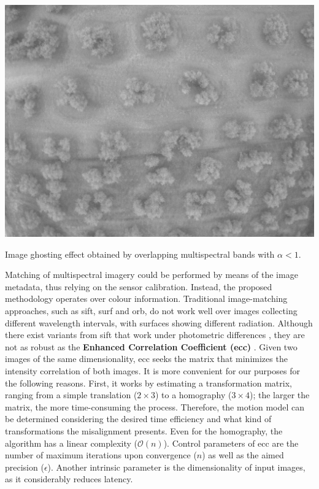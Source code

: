 \begin{marginfigure}[.2cm]
  \includegraphics{figs/image_fusion/multispectral_ghost_effect.png}
  \caption{Image ghosting effect obtained by overlapping multispectral bands with $\alpha < 1$.}
  \label{fig:multispectral_ghost_effect}
\end{marginfigure}
Matching of multispectral imagery could be performed by means of the image metadata, thus relying on the sensor calibration. Instead, the proposed methodology operates over colour information. Traditional image-matching approaches, such as \acrshort{sift}, \acrshort{surf} and \acrshort{orb}, do not work well over images collecting different wavelength intervals, with surfaces showing different radiation. Although there exist variants from \acrshort{sift} that work under photometric differences \cite{park_pi-sift_2008}, they are not as robust as the \textbf{Enhanced Correlation Coefficient (\acrshort{ecc})} \cite{evangelidis_parametric_2008}. Given two images of the same dimensionality, \acrshort{ecc} seeks the matrix that minimizes the intensity correlation of both images. It is more convenient for our purposes for the following reasons. First, it works by estimating a transformation matrix, ranging from a simple translation ($2 \times 3$) to a homography ($3 \times 4$); the larger the matrix, the more time-consuming the process. Therefore, the motion model can be determined considering the desired time efficiency and what kind of transformations the misalignment presents. Even for the homography, the algorithm has a linear complexity ($\mathcal{O}(n)$). Control parameters of \acrshort{ecc} are the number of maximum iterations upon convergence ($n$) as well as the aimed precision ($\epsilon$). Another intrinsic parameter is the dimensionality of input images, as it considerably reduces latency.


